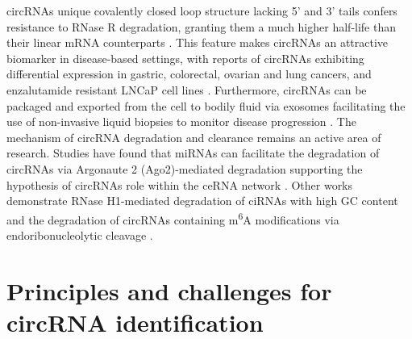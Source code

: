 \documentclass[journal,review,submit,pdftex,moreauthors]{Definitions/mdpi}
\begin{document}
circRNAs unique covalently closed loop structure lacking 5' and 3' tails confers resistance to RNase R degradation, granting them a much higher half-life than their linear mRNA counterparts \cite{Suzuki2006May, Enuka2016Feb}. This feature makes circRNAs an attractive biomarker in disease-based settings, with reports of circRNAs exhibiting differential expression in gastric, colorectal, ovarian and lung cancers, and enzalutamide resistant LNCaP cell lines \cite{Li2015Apr, Bachmayr-Heyda2015, Lim2021Dec}. Furthermore, circRNAs can be packaged and exported from the cell to bodily fluid via exosomes \cite{Li2015Aug, Shi2020Mar} facilitating the use of non-invasive liquid biopsies to monitor disease progression \cite{Wang2019Feb, Wu2023Apr, Pan2019Nov, Li2020Mar, Chen2020Apr, Louis2019Nov}. The mechanism of circRNA degradation and clearance remains an active area of research. Studies have found that miRNAs can facilitate the degradation of circRNAs via Argonaute 2 (Ago2)-mediated degradation supporting the hypothesis of circRNAs role within the ceRNA network \cite{Hansen2011Sep}. Other works demonstrate RNase H1-mediated degradation of ciRNAs with high GC content \cite{Li2021Nov} and the degradation of circRNAs containing m\textsuperscript{6}A modifications via endoribonucleolytic cleavage \cite{Park2019May}. 

\section{Principles and challenges for circRNA identification}
\end{document}
